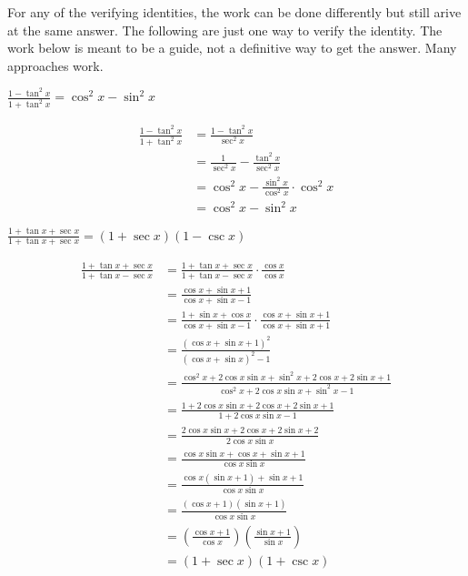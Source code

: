 \documentclass{exam}
\begin{document}
\noindent For any of the verifying identities, the work can be done differently but still arive at the same answer. The following are just one way to verify the identity. The work below is meant to be a guide, not a definitive way to get the answer. Many approaches work.\\
\begin{questions}
\question $\displaystyle\frac{1-\tan^2 x}{1+\tan^2 x}=\cos^2 x-\sin^2 x$
\begin{solution}
\begin{align*}
\frac{1-\tan^2 x}{1+\tan^2 x}&=\frac{1-\tan^2 x}{\sec^2 x}\\
&=\frac{1}{\sec^2 x}-\frac{\tan^2 x}{\sec^2 x} \\
&=\cos^2 x-\frac{\sin^2 x}{\cos^2 x}\cdot\cos^2 x\\
&=\cos^2 x-\sin^2 x
\end{align*}
\end{solution}

\question $\displaystyle\frac{1+\tan x+\sec x}{1+\tan x+\sec x}=(1+\sec x)(1-\csc x)$
\begin{solution}
\begin{align*}
\frac{1+\tan x+\sec x}{1+\tan x-\sec x}&=\frac{1+\tan x+\sec x}{1+\tan x-\sec x}\cdot\frac{\cos x}{\cos x}\\
&=\frac{\cos x+\sin x +1}{\cos x +\sin x-1}\\
&=\frac{1+\sin x +\cos x}{\cos x +\sin x-1}\cdot\frac{\cos x+\sin x +1}{\cos x+\sin x + 1}\\
&=\frac{(\cos x+\sin x +1)^2}{(\cos x +\sin x)^2-1}\\
&=\frac{\cos^2 x+2\cos x\sin x+\sin^2 x+2\cos x+2\sin x+1}{\cos^2 x+2\cos x\sin x+\sin^2 x-1}\\
&=\frac{1+2\cos x\sin x+2\cos x+2\sin x+1}{1 +2\cos x\sin x-1}\\
&=\frac{2\cos x\sin x+2\cos x+2\sin x+2}{2\cos x\sin x}\\
&=\frac{\cos x\sin x+\cos x+\sin x+1}{\cos x\sin x}\\
&=\frac{\cos x(\sin x+1)+\sin x+1}{\cos x\sin x}\\
&=\frac{(\cos x+1)(\sin x+1)}{\cos x\sin x}\\
&=\left(\frac{\cos x+1}{\cos x}\right)\left(\frac{\sin x+1}{\sin x}\right)\\
&=(1+\sec x)(1+\csc x)
\end{align*}
\end{solution}

\newpage


\end{questions}
\end{document}
